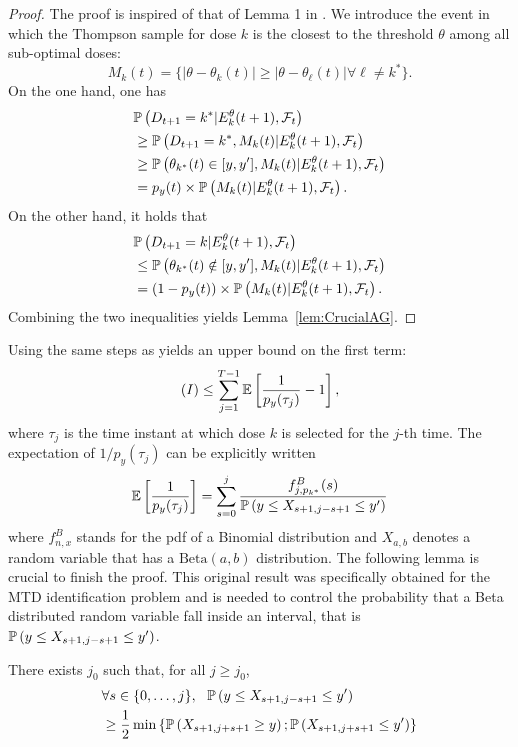 \begin{proof} The proof is inspired of that of Lemma 1 in \cite{AGAISTAT13}. We introduce the event in which the Thompson sample for dose $k$ is the closest to the threshold $\theta$ among all sub-optimal doses:
\[M_k(t) = \{ |\theta - \theta_k(t)| \geq |\theta - \theta_\ell(t)| \forall \ell \neq k^*\}.\]
On the one hand, one has
\begin{align*}
 & \mathbb{P}\left(D_{t+1} = k^* | E_k^\theta(t+1),\mathcal{F}_t\right)
 \\ & \geq
 	\mathbb{P}\left(D_{t+1} = k^*,M_k(t) | E_k^\theta(t+1),\mathcal{F}_t\right)
 \\ & \geq
   \mathbb{P}\left(\theta_{k^*}(t) \in [y,y'],M_k(t) | E_k^\theta(t+1),\mathcal{F}_t\right) 
\\ & =
	p_y(t) \times \mathbb{P}\left(M_k(t) | E_k^\theta(t+1),\mathcal{F}_t\right).
\end{align*}
On the other hand, it holds that 
\begin{align*}
& \mathbb{P}\left(D_{t+1} = k | E_k^\theta(t+1),\mathcal{F}_t\right)
\\ & \leq \mathbb{P}\left(\theta_{k^*}(t) \notin [y, y'], M_k(t) | E_k^\theta(t+1),\mathcal{F}_t\right)
\\ & = (1 - p_y(t)) \times \mathbb{P}\left(M_k(t) | E_k^\theta(t+1),\mathcal{F}_t\right).
\end{align*}
Combining the two inequalities yields Lemma~\ref{lem:CrucialAG}.
\end{proof}

Using the same steps as \cite{AGAISTAT13} yields an upper bound on the first term:
\[(I) \leq \sum_{j=1}^{T-1}\mathbb{E}\left[\frac{1}{p_y(\tau_{j})} - 1\right],\]
where $\tau_j$ is the time instant at which dose $k$ is selected for the $j$-th time. The expectation of $1/p_y(\tau_{j})$ can be explicitly written 
\[\mathbb{E}\left[\frac{1}{p_y(\tau_{j})}\right] =\sum_{s=0}^j \frac{f^B_{j,p_{k^*}}(s)}{\mathbb{P}\left(y \leq X_{s+1,j-s+1} \leq y'\right)} \]
where $f^B_{n,x}$ stands for the pdf of a Binomial distribution and $X_{a,b}$ denotes a random variable that has a $\mathrm{Beta}(a,b)$ distribution. The following lemma is crucial to finish the proof. This original result was specifically obtained for the MTD identification problem and is needed to control the probability that a Beta distributed random variable fall inside an interval, that is $\mathbb{P}\left(y \leq X_{s+1,j-s+1} \leq y'\right)$.


\begin{lemma}\label{lem:Technical} There exists $j_0$ such that, for all $j \geq j_0$,
\begin{align*}
&\forall s \in \{0,\dots, j\}, \ \ \mathbb{P}\left(y \leq X_{s+1,j-s+1} \leq y'\right) 
\\ 
&\geq \frac{1}{2}\min  \left\{\mathbb{P}\left(X_{s+1,j+s+1} \geq y\right) ; \mathbb{P}\left(X_{s+1,j+s+1} \leq y'\right)\right\}
\end{align*}
\end{lemma}

